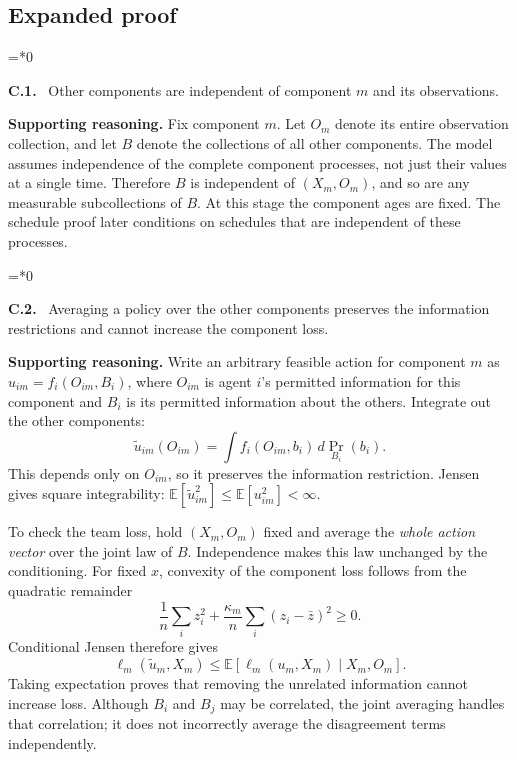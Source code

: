 \documentclass[12pt,letterpaper]{article}
\newcommand{\E}{\mathbb E}
\newenvironment{proofstep}[2]{%
  \begin{list}{}{\leftmargin=\dimexpr 0.17in*#2\relax%
  \setlength{\rightmargin}{0pt}\setlength{\topsep}{5pt}\setlength{\parsep}{2pt}}%
  \item[]\textbf{\textcolor{ink}{#1.}}\ }{\end{list}}
\begin{document}
\subsection*{Expanded proof}

\begin{proofstep}{C.1}{0}
\label{step:C.1}
Other components are independent of component $m$ and its observations.

\textbf{Supporting reasoning.}
Fix component $m$. Let $O_m$ denote its entire observation collection, and let $B$ denote the collections of all other components. The model assumes independence of the complete component processes, not just their values at a single time. Therefore $B$ is independent of $(X_m,O_m)$, and so are any measurable subcollections of $B$. At this stage the component ages are fixed. The schedule proof later conditions on schedules that are independent of these processes.
\par{}
\end{proofstep}

\begin{proofstep}{C.2}{0}
\label{step:C.2}
Averaging a policy over the other components preserves the information restrictions and cannot increase the component loss.

\textbf{Supporting reasoning.}
Write an arbitrary feasible action for component $m$ as $u_{im}=f_i(O_{im},B_i)$, where $O_{im}$ is agent $i$'s permitted information for this component and $B_i$ is its permitted information about the others. Integrate out the other components:
\[
\widetilde u_{im}(O_{im})=\int f_i(O_{im},b_i)\,d\Pr_{B_i}(b_i).
\]
This depends only on $O_{im}$, so it preserves the information restriction. Jensen gives square integrability: $\E[\widetilde u_{im}^2]\le\E[u_{im}^2]<\infty$.

To check the team loss, hold $(X_m,O_m)$ fixed and average the \emph{whole action vector} over the joint law of $B$. Independence makes this law unchanged by the conditioning. For fixed $x$, convexity of the component loss follows from the quadratic remainder
\[
\frac1n\sum_i z_i^2+\frac{\kappa_m}{n}\sum_i(z_i-\bar z)^2\ge0.
\]
Conditional Jensen therefore gives
\[
\ell_m(\widetilde u_m,X_m)
\le\E[\ell_m(u_m,X_m)\mid X_m,O_m].
\]
Taking expectation proves that removing the unrelated information cannot increase loss. Although $B_i$ and $B_j$ may be correlated, the joint averaging handles that correlation; it does not incorrectly average the disagreement terms independently.
\par{}
\end{proofstep}
\end{document}
